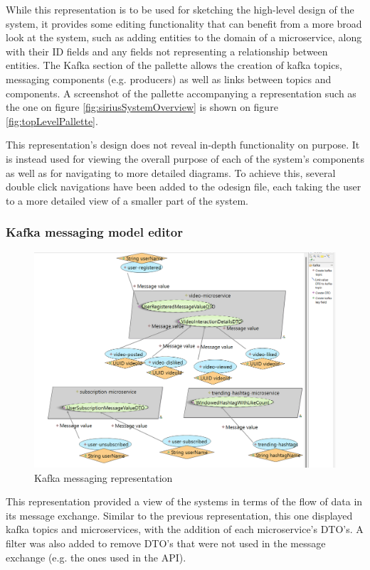 \documentclass[parskip=full]{article}
\begin{document}
    While this representation is to be used for sketching the high-level design of the system, it provides some editing functionality that can benefit from a more broad look at the system, such as adding entities to the domain of a microservice, along with their ID fields and any fields not representing a relationship between entities.
    The Kafka section of the pallette allows the creation of kafka topics, messaging components (e.g. producers) as well as links between topics and components.
    A screenshot of the pallette accompanying a representation such as the one on figure \ref{fig:siriusSystemOverview} is shown on figure \ref{fig:topLevelPallette}.

    This representation's design does not reveal in-depth functionality on purpose.
    It is instead used for viewing the overall purpose of each of the system's components as well as for navigating to more detailed diagrams.
    To achieve this, several double click navigations have been added to the odesign file, each taking the user to a more detailed view of a smaller part of the system.
    \subsubsection{Kafka messaging model editor}
    \begin{figure}
        \vspace{-3em}
        \includegraphics[height=0.15\paperheight]{messaging-overview-with-pallette}
        \caption{Kafka messaging representation}
        \label{fig:kafkaMessagingEditor}
        \vspace{-1em}
    \end{figure}
    This representation provided a view of the systems in terms of the flow of data in its message exchange.
    Similar to the previous representation, this one displayed kafka topics and microservices, with the addition of each microservice's DTO's.
    A filter was also added to remove DTO's that were not used in the message exchange (e.g. the ones used in the API).
\end{document}

